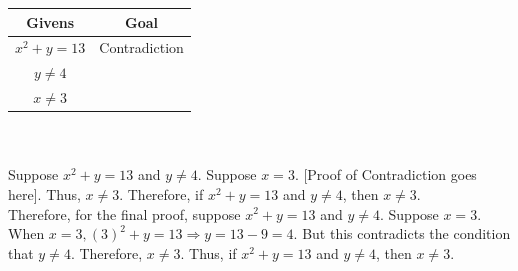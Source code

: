 \documentclass[../setup.tex]{subfiles}
\begin{document}
\begin{center}
	\begin{tabular}[t]{| c | c |}
		\hline
		Givens  & Goal  \\
		\hline
		$x^2 + y = 13$ & Contradiction \\
		$y \neq 4$ & \\
		$x \neq 3$ & \\
		\hline
	\end{tabular}
\end{center}
\phantom \\ \\
Suppose $x^2 + y =13$ and $y \neq 4$. Suppose $x = 3$. [Proof of Contradiction goes here]. Thus, $x \neq 3$. Therefore, if $x^2 + y = 13$ and $y \neq 4$, then $x \neq 3$. \\
Therefore, for the final proof, suppose $x^2 + y =13$ and $y \neq 4$. Suppose $x = 3$. When $x = 3, (3)^2 + y = 13 \Rightarrow y = 13 - 9 = 4$. But this contradicts the condition that $y \neq 4$. Therefore, $x \neq 3$. Thus, if $x^2 + y = 13$ and $y \neq 4$, then $x \neq 3$. \\
\phantom \\ \\
\end{document}
